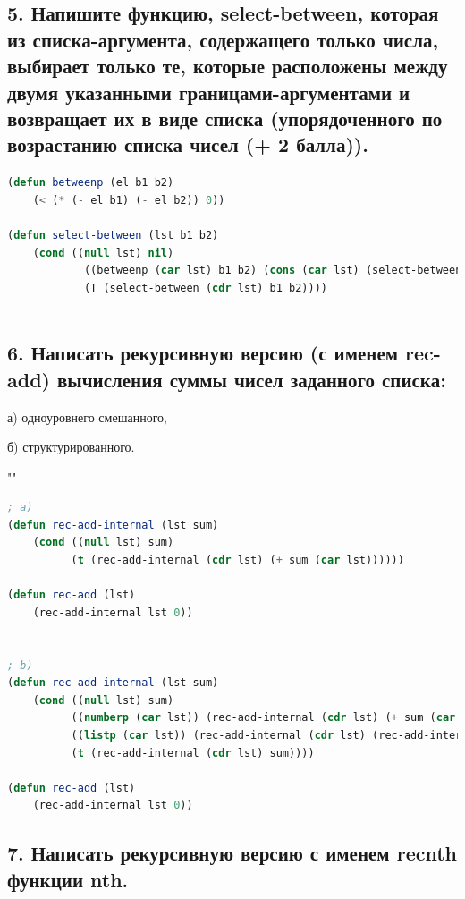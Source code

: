 \documentclass[12pt]{report}
\begin{document}
\subsection*{5. Напишите функцию, select-between, которая из списка-аргумента, содержащего только
	числа, выбирает только те, которые расположены между двумя указанными границами-аргументами и возвращает их в виде списка (упорядоченного по возрастанию списка чисел
	(+ 2 балла)).}

\begin{lstlisting}[label=6xd, caption=Решение задания №5, language=lisp]
(defun betweenp (el b1 b2)
	(< (* (- el b1) (- el b2)) 0))

(defun select-between (lst b1 b2)
	(cond ((null lst) nil)
			((betweenp (car lst) b1 b2) (cons (car lst) (select-between (cdr lst) b1 b2)))
			(T (select-between (cdr lst) b1 b2))))
	
\end{lstlisting}

\subsection*{6. Написать рекурсивную версию (с именем rec-add) вычисления суммы чисел заданного
	списка:}

а) одноуровнего смешанного,

б) структурированного.

""\newline
\begin{lstlisting}[label=6xd, caption=Решение задания №6, language=lisp]
; a)
(defun rec-add-internal (lst sum) 
	(cond ((null lst) sum) 
		  (t (rec-add-internal (cdr lst) (+ sum (car lst))))))
		  
(defun rec-add (lst) 
	(rec-add-internal lst 0))


; b)
(defun rec-add-internal (lst sum) 
	(cond ((null lst) sum) 
		  ((numberp (car lst)) (rec-add-internal (cdr lst) (+ sum (car lst))))
		  ((listp (car lst)) (rec-add-internal (cdr lst) (rec-add-internal (car lst) sum)))
		  (t (rec-add-internal (cdr lst) sum))))

(defun rec-add (lst) 
	(rec-add-internal lst 0))
\end{lstlisting}

\subsection*{7. Написать рекурсивную версию с именем recnth функции nth.}
\end{document}
